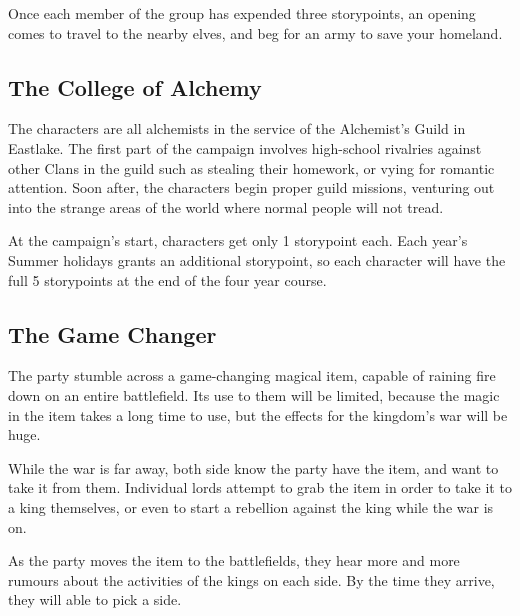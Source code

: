 {\begin{multicols}{2}
Once each member of the group has expended three \glspl{storypoint}, an opening comes to travel to the nearby elves, and beg for an army to save your homeland.

\subsection{The College of Alchemy}

The characters are all alchemists in the service of the Alchemist's Guild in Eastlake.
The first part of the campaign involves high-school rivalries against other Clans in the guild such as stealing their homework, or vying for romantic attention.
Soon after, the characters begin proper guild missions, venturing out into the strange areas of the world where normal people will not tread.

At the campaign's start, characters get only 1 \gls{storypoint} each.
Each year's Summer holidays grants an additional \gls{storypoint}, so each character will have the full 5 \glspl{storypoint} at the end of the four year course.

\subsection{The Game Changer}

The party stumble across a game-changing magical item, capable of raining fire down on an entire battlefield.
Its use to them will be limited, because the magic in the item takes a long time to use, but the effects for the kingdom's war will be huge.

While the war is far away, both side know the party have the item, and want to take it from them.
Individual lords attempt to grab the item in order to take it to a king themselves, or even to start a rebellion against the king while the war is on.

As the party moves the item to the battlefields, they hear more and more rumours about the activities of the kings on each side.
By the time they arrive, they will able to pick a side.

\end{multicols}

}{}
